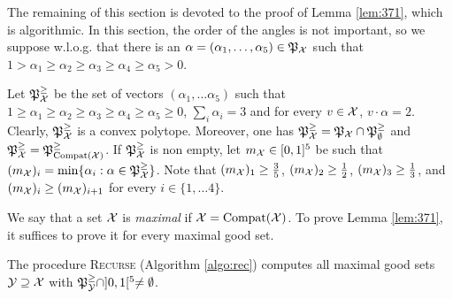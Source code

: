 \documentclass[11pt]{article}
\theoremstyle{definition}
\begin{document}
%
%

%
%
%

\def\polydec{\mathfrak{P}^\ge}
\def\mfQ{\mathfrak{Q}}

The remaining of this section is devoted to the proof of Lemma \ref{lem:371}, which is algorithmic.
%
In this section, the order of the angles is not important, so we suppose w.l.o.g. that there is an $\alpha=(\alpha_1,\ldots ,\alpha_5)\in \mathfrak{P}_{\mathcal{X}}$ such that $1 > \alpha_1 \ge \alpha_2 \ge \alpha_3 \ge \alpha_4 \ge \alpha_5 > 0$.

Let $\polydec_\mX$ be the set of vectors $(\alpha_1,\ldots \alpha_5)$ such that $1 \ge \alpha_1 \ge \alpha_2 \ge \alpha_3 \ge \alpha_4 \ge \alpha_5 \ge 0$, $\sum_i \alpha_i=3$ and for every $v\in \mathcal{X}$, $v \cdot \alpha = 2$. Clearly, $\polydec_\mX$ is a convex polytope. Moreover, one has $\polydec_\mX = \poly_\mX \cap \polydec_\emptyset$ and $\polydec_\mX = \polydec_{\compat(\mX)}$.
If $\polydec_\mX$ is non empty, let $m_{\mathcal{X}} \in [0,1]^5$ be such that $(m_\mX)_i = \min \{ \alpha_i : \alpha \in \polydec_\mX\}$. Note that $(m_{\mathcal{X}})_1\ge \frac{3}{5}$, $(m_{\mathcal{X}})_2\ge \frac{1}{2}$, $(m_{\mathcal{X}})_3\ge \frac{1}{3}$, and $(m_{\mathcal{X}})_i\ge (m_{\mathcal{X}})_{i+1}$ for every $i\in\{1,\ldots 4\}$.
%


%
%
%
%
%
%
%

%

%

%
%
%
%
%
%
%
%
%
%
%
%
%
%

%
%
%
%
%
%
%
%
%
%
%
%
%

%

%
%

%

\def\namerecproc{Recurse}

We say that a set $\mathcal{X}$ is \emph{maximal} if $\mathcal{X}=\operatorname{Compat}(\mathcal{X})$. To prove Lemma \ref{lem:371}, it suffices to prove it for every maximal good set.

%
The procedure \textsc{\namerecproc} (Algorithm \ref{algo:rec}) computes all maximal good sets $\mathcal{Y}\supseteq \mathcal{X}$ with  $\polydec_{\mY} \cap ]0,1[^5 \ne \emptyset$.
\end{document}
